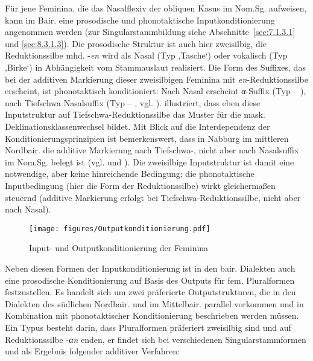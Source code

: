 Für jene Feminina, die das Nasalflexiv der obliquen Kasus im Nom.Sg. aufweisen, kann im Bair. eine prosodische und phonotaktische Inputkonditionierung angenommen werden (zur Singularstammbildung siehe Abschnitte~\ref{sec:7.1.3.1} und \ref{sec:8.3.1.3}). Die prosodische Struktur ist auch hier zweisilbig, die Reduktionssilbe mhd. -\textit{en} wird als Nasal (Typ  ‚Tasche‘) oder vokalisch (Typ  ‚Birke‘) in Abhängigkeit vom Stammauslaut realisiert. Die Form des Suffixes, das bei der additiven Markierung dieser zweisilbigen Feminina mit \textit{en}-Reduktionssilbe erscheint, ist phonotaktisch konditioniert: Nach Nasal erscheint \textit{α}{}-Suffix (Typ  -- ), nach Tiefschwa Nasalsuffix (Typ  -- , vgl. ).  illustriert, dass eben diese Inputstruktur auf Tief\-schwa-Re\-duk\-tions\-sil\-be das Muster für die mask. Deklinationsklassenwechsel bildet. Mit Blick auf die Interdependenz der Konditionierungsprinzipien ist bemerkenswert, dass in Nabburg im mittleren Nordbair. die additive Markierung nach Tiefschwa-, nicht aber nach Nasalsuffix im Nom.Sg. belegt ist (vgl.  und ). Die zweisilbige Inputstruktur ist damit eine notwendige, aber keine hinreichende Bedingung; die phonotaktische Inputbedingung (hier die Form der Reduktionssilbe) wirkt gleichermaßen steuernd (additive Markierung erfolgt bei Tief\-schwa-Re\-duk\-tions\-sil\-be, nicht aber nach Nasal).



\begin{figure}
\texttt{[image: figures/Outputkonditionierung.pdf]}
\caption{Input- und Outputkonditionierung der Feminina}
\label{fig:15}
\end{figure}

Neben diesen Formen der Inputkonditionierung ist in den bair. Dialekten auch eine prosodische Konditionierung auf Basis des Outputs für fem. Pluralformen festzustellen. Es handelt sich um zwei präferierte Outputstrukturen, die in den Dialekten des südlichen Nordbair. und im Mittelbair. parallel vorkommen und in Kombination mit phonotaktischer Konditionierung beschrieben werden müssen. Ein Typus besteht darin, dass Pluralformen präferiert zweisilbig sind und auf Reduktionssilbe {-\textit{αn}} enden, er findet sich bei verschiedenen Singularstammformen und als Ergebnis folgender additiver Verfahren:

